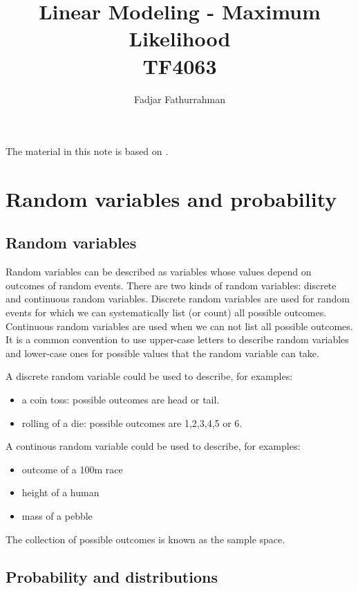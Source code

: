 




\title{Linear Modeling - Maximum Likelihood\\
TF4063}
\author{Fadjar Fathurrahman}
\date{}
\maketitle

The material in this note is based on \cite{Rogers2017}.


\section{Random variables and probability}

\subsection{Random variables}

Random variables can be described as variables whose values depend on
outcomes of random events. There are two kinds of random variables:
discrete and continuous random variables. Discrete random variables are used
for random events for which we can systematically list (or count) all possible
outcomes. Continuous random variables are used when we can not list all
possible outcomes.
It is a common convention to use upper-case letters to describe random variables
and lower-case ones for possible values that the random variable can take.

A discrete random variable could be used to describe, for examples:
\begin{itemize}
\item a coin toss: possible outcomes are head or tail.
\item rolling of a die: possible outcomes are 1,2,3,4,5 or 6.
\end{itemize}

A continous random variable could be used to describe, for examples:
\begin{itemize}
\item outcome of a 100m race
\item height of a human
\item mass of a pebble
\end{itemize}

The collection of possible outcomes is known as the sample space.

\subsection{Probability and distributions}

